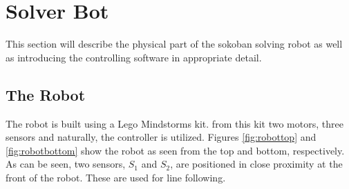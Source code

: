 \section{Solver Bot}
This section will describe the physical part of the sokoban solving robot as well as introducing the controlling software in appropriate detail.
\subsection{The Robot}
The robot is built using a Lego Mindstorms kit.
from this kit two motors, three sensors and naturally, the controller is utilized.
Figures \ref{fig:robottop} and \ref{fig:robotbottom} show the robot as seen from the top and bottom, respectively.
As can be seen, two sensors, $S_1$ and $S_2$, are positioned in close proximity at the front of the robot.
These are used for line following. 

